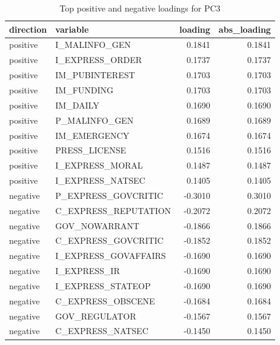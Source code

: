 \begin{table}
\caption{Top positive and negative loadings for PC3}
\label{tab:pc3_loadings}
\begin{tabular}{llrr}
\toprule
direction & variable & loading & abs_loading \\
\midrule
positive & I_MALINFO_GEN & 0.1841 & 0.1841 \\
positive & I_EXPRESS_ORDER & 0.1737 & 0.1737 \\
positive & IM_PUBINTEREST & 0.1703 & 0.1703 \\
positive & IM_FUNDING & 0.1703 & 0.1703 \\
positive & IM_DAILY & 0.1690 & 0.1690 \\
positive & P_MALINFO_GEN & 0.1689 & 0.1689 \\
positive & IM_EMERGENCY & 0.1674 & 0.1674 \\
positive & PRESS_LICENSE & 0.1516 & 0.1516 \\
positive & I_EXPRESS_MORAL & 0.1487 & 0.1487 \\
positive & I_EXPRESS_NATSEC & 0.1405 & 0.1405 \\
negative & P_EXPRESS_GOVCRITIC & -0.3010 & 0.3010 \\
negative & C_EXPRESS_REPUTATION & -0.2072 & 0.2072 \\
negative & GOV_NOWARRANT & -0.1866 & 0.1866 \\
negative & C_EXPRESS_GOVCRITIC & -0.1852 & 0.1852 \\
negative & I_EXPRESS_GOVAFFAIRS & -0.1690 & 0.1690 \\
negative & I_EXPRESS_IR & -0.1690 & 0.1690 \\
negative & I_EXPRESS_STATEOP & -0.1690 & 0.1690 \\
negative & C_EXPRESS_OBSCENE & -0.1684 & 0.1684 \\
negative & GOV_REGULATOR & -0.1567 & 0.1567 \\
negative & C_EXPRESS_NATSEC & -0.1450 & 0.1450 \\
\bottomrule
\end{tabular}
\end{table}

